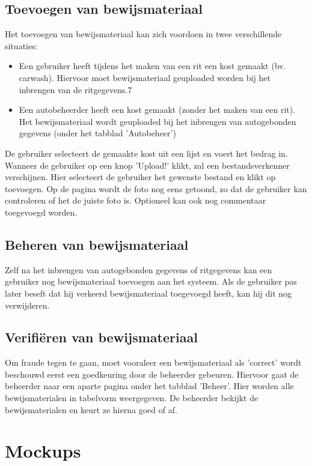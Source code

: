 \documentclass[11pt,a4paper,oneside]{article}
\begin{document}
\subsection{Toevoegen van bewijsmateriaal}
Het toevoegen van bewijsmateriaal kan zich voordoen in twee verschillende situaties:
\begin{itemize}
 \item Een gebruiker heeft tijdens het maken van een rit een kost gemaakt (bv. carwash). Hiervoor moet bewijsmateriaal geuploaded worden bij het inbrengen van de ritgegevens.7
 \item Een autobeheerder heeft een kost gemaakt (zonder het maken van een rit). Het bewijsmateriaal wordt geuploaded bij het inbrengen van autogebonden gegevens (onder het tabblad 'Autobeheer')
\end{itemize}
De gebruiker selecteert de gemaakte kost uit een lijst en voert het bedrag in. Wanneer de gebruiker op een knop 'Upload!' klikt, zal een bestandsverkenner verschijnen. Hier selecteert de gebruiker het gewenste bestand en klikt op toevoegen. 
Op de pagina wordt de foto nog eens getoond, zo dat de gebruiker kan controleren of het de juiste foto is. Optioneel kan ook nog commentaar toegevoegd worden.

\subsection{Beheren van bewijsmateriaal}
Zelf na het inbrengen van autogebonden gegevens of ritgegevens kan een gebruiker nog bewijsmateriaal toevoegen aan het systeem. Als de gebruiker pas later
beseft dat hij verkeerd bewijsmateriaal toegevoegd heeft, kan hij dit nog verwijderen.

\subsection{Verifi\"{e}ren van bewijsmateriaal}
Om fraude tegen te gaan, moet vooraleer een bewijsmateriaal als 'correct' wordt beschouwd eerst een goedkeuring door de beheerder gebeuren.
Hiervoor gaat de beheerder naar een aparte pagina onder het tabblad 'Beheer'. Hier worden alle bewijsmaterialen in tabelvorm weergegeven.
De beheerder bekijkt de bewijsmaterialen en keurt ze hierna goed of af.

\section{Mockups}
\end{document}
